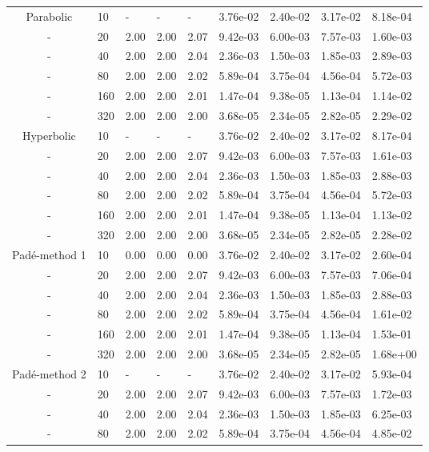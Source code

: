 \begin{table}[htbp]
{\begin{tabular}{cllllllll}
   \hline
   Parabolic &  10 & - & - & - & 3.76e-02 & 2.40e-02 & 3.17e-02 & 8.18e-04 \\ 
   - &   20 & 2.00 & 2.00 & 2.07 & 9.42e-03 & 6.00e-03 & 7.57e-03 & 1.60e-03 \\ 
   - &   40 & 2.00 & 2.00 & 2.04 & 2.36e-03 & 1.50e-03 & 1.85e-03 & 2.89e-03 \\ 
   - &   80 & 2.00 & 2.00 & 2.02 & 5.89e-04 & 3.75e-04 & 4.56e-04 & 5.72e-03 \\ 
   - &  160 & 2.00 & 2.00 & 2.01 & 1.47e-04 & 9.38e-05 & 1.13e-04 & 1.14e-02 \\ 
   - &  320 & 2.00 & 2.00 & 2.00 & 3.68e-05 & 2.34e-05 & 2.82e-05 & 2.29e-02 \\
   \hline
   Hyperbolic & 10 & - & - & - & 3.76e-02 & 2.40e-02 & 3.17e-02 & 8.17e-04 \\ 
   - &   20 & 2.00 & 2.00 & 2.07 & 9.42e-03 & 6.00e-03 & 7.57e-03 & 1.61e-03 \\ 
   - &   40 & 2.00 & 2.00 & 2.04 & 2.36e-03 & 1.50e-03 & 1.85e-03 & 2.88e-03 \\ 
   - &   80 & 2.00 & 2.00 & 2.02 & 5.89e-04 & 3.75e-04 & 4.56e-04 & 5.72e-03 \\ 
   - &  160 & 2.00 & 2.00 & 2.01 & 1.47e-04 & 9.38e-05 & 1.13e-04 & 1.13e-02 \\ 
   - &  320 & 2.00 & 2.00 & 2.00 & 3.68e-05 & 2.34e-05 & 2.82e-05 & 2.28e-02 \\
   \hline
   Pad\'e-method 1  &  10 & 0.00 & 0.00 & 0.00 & 3.76e-02 & 2.40e-02 & 3.17e-02 & 2.60e-04 \\ 
   -  &  20 & 2.00 & 2.00 & 2.07 & 9.42e-03 & 6.00e-03 & 7.57e-03 & 7.06e-04 \\ 
   -  &  40 & 2.00 & 2.00 & 2.04 & 2.36e-03 & 1.50e-03 & 1.85e-03 & 2.88e-03 \\ 
   -  &  80 & 2.00 & 2.00 & 2.02 & 5.89e-04 & 3.75e-04 & 4.56e-04 & 1.61e-02 \\ 
   -  & 160 & 2.00 & 2.00 & 2.01 & 1.47e-04 & 9.38e-05 & 1.13e-04 & 1.53e-01 \\ 
   -  & 320 & 2.00 & 2.00 & 2.00 & 3.68e-05 & 2.34e-05 & 2.82e-05 & 1.68e+00 \\
   \hline
   Pad\'e-method 2 &  10 & - & - & - & 3.76e-02 & 2.40e-02 & 3.17e-02 & 5.93e-04 \\ 
   - &  20 & 2.00 & 2.00 & 2.07 & 9.42e-03 & 6.00e-03 & 7.57e-03 & 1.72e-03 \\ 
   - &  40 & 2.00 & 2.00 & 2.04 & 2.36e-03 & 1.50e-03 & 1.85e-03 & 6.25e-03 \\ 
   - &  80 & 2.00 & 2.00 & 2.02 & 5.89e-04 & 3.75e-04 & 4.56e-04 & 4.85e-02 \\ 

\end{tabular}}
\end{table}
